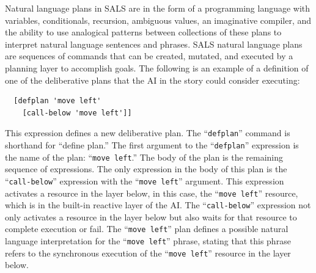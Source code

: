 Natural language plans in SALS are in the form of a programming
language with variables, conditionals, recursion, ambiguous values, an
imaginative compiler, and the ability to use analogical patterns
between collections of these plans to interpret natural language
sentences and phrases.  SALS natural language plans are sequences of
commands that can be created, mutated, and executed by a planning
layer to accomplish goals.  The following is an example of a
definition of one of the deliberative plans that the AI in the story
could consider executing:
\begin{samepage}
\begin{Verbatim}
  [defplan 'move left'
    [call-below 'move left']]
\end{Verbatim}
\end{samepage}
This expression defines a new deliberative plan.  The
``{\tt{defplan}}'' command is shorthand for ``define plan.''  The
first argument to the ``{\tt{defplan}}'' expression is the name of the
plan: ``{\tt{move left}}.''  The body of the plan is the remaining
sequence of expressions.  The only expression in the body of this plan
is the ``{\tt{call-below}}'' expression with the ``{\tt{move left}}''
argument.  This expression activates a resource in the layer below, in
this case, the ``{\tt{move left}}'' resource, which is in the built-in
reactive layer of the AI.  The ``{\tt{call-below}}'' expression not
only activates a resource in the layer below but also waits for that
resource to complete execution or fail.  The ``{\tt{move left}}'' plan
defines a possible natural language interpretation for the ``{\tt{move
    left}}'' phrase, stating that this phrase refers to the
synchronous execution of the ``{\tt{move left}}'' resource in the
layer below.

